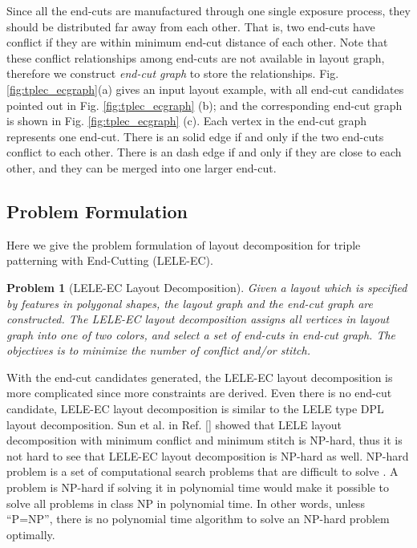 \documentclass[12pt]{spieman}
\theoremstyle{plain}
\newtheorem{myproblem}{Problem}
\begin{document}
\begin{spacing}{1}
Since all the end-cuts are manufactured through one single exposure process, they should be distributed far away from each other.
That is, two end-cuts have conflict if they are within minimum end-cut distance  of each other.
Note that these conflict relationships among end-cuts are not available in layout graph, therefore we construct \textit{end-cut graph} to store the relationships.
Fig. \ref{fig:tplec_ecgraph}(a) gives an input layout example,
with all end-cut candidates pointed out in Fig. \ref{fig:tplec_ecgraph} (b);
and the corresponding end-cut graph is shown in Fig. \ref{fig:tplec_ecgraph} (c).
Each vertex in the end-cut graph represents one end-cut.
There is an solid edge if and only if the two end-cuts conflict to each other.
There is an dash edge if and only if they are close to each other, and they can be merged into one larger end-cut. 

\subsection{Problem Formulation}

Here we give the problem formulation of layout decomposition for triple patterning with End-Cutting (LELE-EC).

\begin{myproblem}[LELE-EC Layout Decomposition]
Given a layout which is specified by features in polygonal shapes, the layout graph and the end-cut graph are constructed.
The LELE-EC layout decomposition assigns all vertices in layout graph into one of two colors, and select a set of end-cuts in end-cut graph.
The objectives is to minimize the number of conflict and/or stitch.
\end{myproblem}

With the end-cut candidates generated, the LELE-EC layout decomposition is more complicated since more constraints are derived.
Even there is no end-cut candidate, LELE-EC layout decomposition is similar to the LELE type DPL layout decomposition.
Sun et al. in Ref. [] showed that LELE layout decomposition with minimum conflict and minimum stitch is NP-hard,
thus it is not hard to see that LELE-EC layout decomposition is NP-hard as well.
NP-hard problem is a set of computational search problems that are difficult to solve
\cite{book90Algorithm}.
A problem is NP-hard if solving it in polynomial time would make it possible to solve all problems in class NP in polynomial time. 
In other words, unless ``P=NP'', there is no polynomial time algorithm to solve an NP-hard problem optimally.



\end{spacing}
\end{document}

